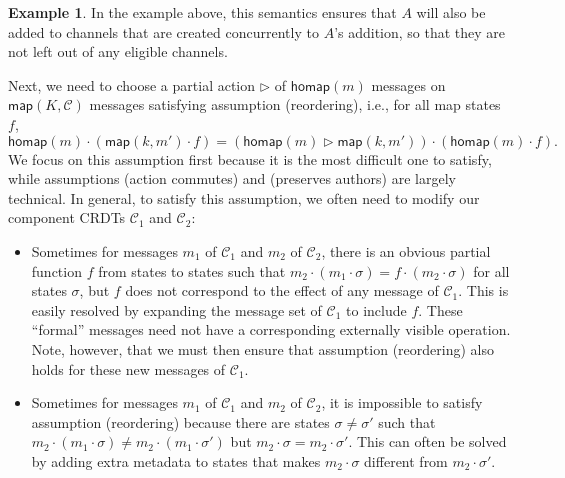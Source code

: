 \documentclass[acmsmall,nonacm]{acmart}
\newcommand{\mc}[1]{\ensuremath{\mathcal{#1}}}
\newcommand{\msf}[1]{\ensuremath{\mathsf{#1}}}
\newcommand{\act}{\triangleright}
\theoremstyle{plain}
\theoremstyle{definition}
\newtheorem{myex}[mythm]{Example}
\begin{document}
\begin{myex}
In the example above, this semantics ensures that $A$ will also be added to channels that are created concurrently to $A$'s addition, so that they are not left out of any eligible channels.
\end{myex}

Next, we need to choose a partial action $\act$ of $\msf{homap}(m)$ messages on $\msf{map}(K, \mc{C})$ messages satisfying assumption (reordering), i.e., for all map states $f$,
\begin{equation}
\label{reordering_ex}
\msf{homap}(m) \cdot (\msf{map}(k, m') \cdot f) = (\msf{homap}(m) \act \msf{map}(k, m')) \cdot (\msf{homap}(m) \cdot f).
\end{equation}
We focus on this assumption first because it is the most difficult one to satisfy, while assumptions (action commutes) and (preserves authors) are largely technical.  In general, to satisfy this assumption, we often need to modify our component CRDTs $\mc{C}_1$ and $\mc{C}_2$:
\begin{itemize}
    \item Sometimes for messages $m_1$ of $\mc{C}_1$ and $m_2$ of $\mc{C}_2$, there is an obvious partial function $f$ from states to states such that $m_2 \cdot (m_1 \cdot \sigma) = f \cdot (m_2 \cdot \sigma)$ for all states $\sigma$, but $f$ does not correspond to the effect of any message of $\mc{C}_1$.  This is easily resolved by expanding the message set of $\mc{C}_1$ to include $f$.  These ``formal'' messages need not have a corresponding externally visible operation.  Note, however, that we must then ensure that assumption (reordering) also holds for these new messages of $\mc{C}_1$.
    \item Sometimes for messages $m_1$ of $\mc{C}_1$ and $m_2$ of $\mc{C}_2$, it is impossible to satisfy assumption (reordering) because there are states $\sigma \neq \sigma'$ such that $m_2 \cdot (m_1 \cdot \sigma) \neq m_2 \cdot (m_1 \cdot \sigma')$ but $m_2 \cdot \sigma = m_2 \cdot \sigma'$.  This can often be solved by adding extra metadata to states that makes $m_2 \cdot \sigma$ different from $m_2 \cdot \sigma'$.
\end{itemize}
\end{document}
